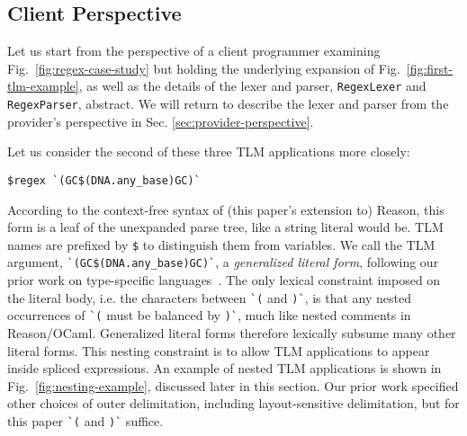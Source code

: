 \documentclass[acmsmall]{acmart}
\newcommand{\li}[1]{\lstinline[basicstyle=\ttfamily\fontsize{9pt}{1em}\selectfont]{#1}}
\begin{document}
\subsection{Client Perspective}\label{sec:client-perspective}
Let us start from the perspective of a client programmer examining Fig.~\ref{fig:regex-case-study} but holding the underlying expansion of Fig.~\ref{fig:first-tlm-example}, as well as the details of the lexer and parser, \li{RegexLexer} and \li{RegexParser}, abstract. We will return to describe the lexer and parser from the provider's perspective in Sec. \ref{sec:provider-perspective}.



Let us consider the second of these three TLM applications more closely:
\begin{lstlisting}[numbers=none]
    $regex `(GC$(DNA.any_base)GC)`
\end{lstlisting}
According to the context-free syntax of (this paper's extension to) Reason, this form is a leaf of the unexpanded parse tree, like a string literal would be. TLM names are prefixed by \li{$} 
 to distinguish them from variables. We call the TLM argument, \li{`(GC$(DNA.any_base)GC)`}, a \emph{generalized literal form}, following our prior work on type-specific languages~\cite{TSLs}. The only lexical constraint imposed on the {literal body}, i.e. the characters between \li{`(} and \li{)`}, is that any nested occurrences of \li{`(} must be balanced by \li{)`}, much like nested comments in Reason/OCaml. Generalized literal forms therefore lexically subsume many other literal forms. This nesting constraint is to allow TLM applications to appear inside spliced expressions. An example of nested TLM applications is shown in Fig.~\ref{fig:nesting-example}, discussed later in this section. Our prior work \cite{TSLs} specified other choices of outer delimitation, including layout-sensitive delimitation, but for  this paper \li{`(} and \li{)`} suffice. 
\end{document}
